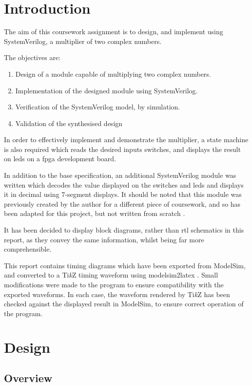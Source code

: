 \section{Introduction} \label{sec:intro}
The aim of this coursework assignment is to design, and implement using SystemVerilog, a multiplier of two complex numbers.

The objectives are:
\begin{enumerate}
	\item Design of a module capable of multiplying two complex numbers.
	\item Implementation of the designed module using SystemVerilog.
	\item Verification of the SystemVerilog model, by simulation.
	\item Validation of the synthesised design
\end{enumerate}

In order to effectively implement and demonstrate the multiplier, a state machine is also required which reads the desired inputs switches, and displays the result on \glspl{led} on a \gls{fpga} development board.

In addition to the base specification, an additional SystemVerilog module was written which decodes the value displayed on the switches and \glspl{led} and displays it in decimal using 7-segment displays. It should be noted that this module was previously created by the author for a different piece of coursework, and so has been adapted for this project, but not written from scratch \cite{tyler2017}.

It has been decided to display block diagrams, rather than \gls{rtl} schematics in this report, as they convey the same information, whilst being far more comprehensible.

This report contains timing diagrams which have been exported from ModelSim, and converted to a Ti\textit{k}Z timing waveform using modelsim2latex \cite{show2016}. Small modifications were made to the program to ensure compatibility with the exported waveforms. In each case, the waveform rendered by Ti\textit{k}Z has been checked against the displayed result in ModelSim, to ensure correct operation of the program.

\FloatBarrier
\section{Design} \label{sec:design}

\subsection{Overview} \label{sec:design-overview}

